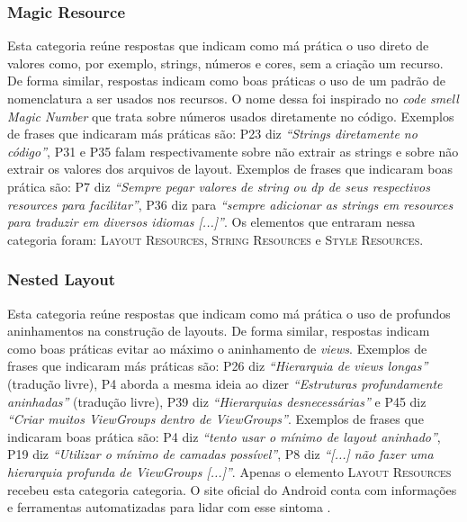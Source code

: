 \subsubsection{Magic Resource}
Esta categoria re\'une respostas que indicam como m\'a pr\'atica o uso direto de valores como, por exemplo, strings, n\'umeros e cores, sem a cria\c{c}\~ao um recurso. De forma similar, respostas indicam como boas pr\'aticas o uso de um padr\~ao de nomenclatura a ser usados nos recursos. O nome dessa foi inspirado no \textit{code smell} \textit{Magic Number} \cite{Martin:2008:CCH:1388398} que trata sobre n\'umeros usados diretamente no c\'odigo. Exemplos de frases que indicaram m\'as pr\'aticas s\~ao: P23 diz \textit{``Strings diretamente no c\'odigo''}, P31 e P35 falam respectivamente sobre n\~ao extrair as strings e sobre n\~ao extrair os valores dos arquivos de layout. Exemplos de frases que indicaram boas pr\'atica s\~ao: P7 diz \textit{``Sempre pegar valores de string ou dp de seus respectivos resources para facilitar''}, P36 diz para \textit{``sempre adicionar as strings em resources para traduzir em diversos idiomas [...]''}. Os elementos que entraram nessa categoria foram: \textsc{Layout Resources}, \textsc{String Resources} e \textsc{Style Resources}. 

\subsubsection{Nested Layout} 
Esta categoria re\'une respostas que indicam como m\'a pr\'atica o uso de profundos aninhamentos na constru\c{c}\~ao de layouts. De forma similar, respostas indicam como boas pr\'aticas evitar ao m\'aximo o aninhamento de \textit{views}. Exemplos de frases que indicaram m\'as pr\'aticas s\~ao: P26 diz \textit{``Hierarquia de views longas''} (tradu\c{c}\~ao livre), P4 aborda a mesma ideia ao dizer \textit{``Estruturas profundamente aninhadas''} (tradu\c{c}\~ao livre), P39 diz \textit{``Hierarquias desnecess\'arias''} e P45 diz \textit{``Criar muitos ViewGroups dentro de ViewGroups''}. Exemplos de frases que indicaram boas pr\'atica s\~ao: P4 diz \textit{``tento usar o m\'inimo de layout aninhado''}, P19 diz \textit{``Utilizar o m\'inimo de camadas poss\'ivel''}, P8 diz \textit{``[...] n\~ao fazer uma hierarquia profunda de ViewGroups [...]''}. Apenas o elemento \textsc{Layout Resources} recebeu esta categoria categoria. O site oficial do Android conta com informa\c{c}\~oes e ferramentas automatizadas para lidar com esse sintoma \cite{OptmizingViewHierarchies}.


